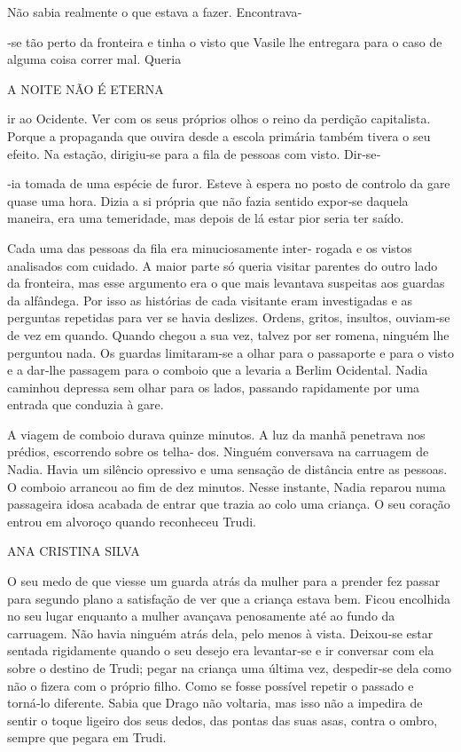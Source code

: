 Não sabia realmente o que estava a fazer. Encontrava‑

‑se tão perto da fronteira e tinha o visto que Vasile lhe entregara para
o caso de alguma coisa correr mal. Queria

A NOITE NÃO É ETERNA

ir ao Ocidente. Ver com os seus próprios olhos o reino da perdição
capitalista. Porque a propaganda que ouvira desde a escola primária
também tivera o seu efeito. Na estação, dirigiu‑se para a fila de
pessoas com visto. Dir‑se‑

‑ia tomada de uma espécie de furor. Esteve à espera no posto de controlo
da gare quase uma hora. Dizia a si própria que não fazia sentido
expor‑se daquela maneira, era uma temeridade, mas depois de lá estar
pior seria ter saído.

Cada uma das pessoas da fila era minuciosamente inter‑ rogada e os
vistos analisados com cuidado. A maior parte só queria visitar parentes
do outro lado da fronteira, mas esse argumento era o que mais levantava
suspeitas aos guardas da alfândega. Por isso as histórias de cada
visitante eram investigadas e as perguntas repetidas para ver se havia
deslizes. Ordens, gritos, insultos, ouviam‑se de vez em quando. Quando
chegou a sua vez, talvez por ser romena, ninguém lhe perguntou nada. Os
guardas limitaram‑se a olhar para o passaporte e para o visto e a
dar‑lhe passagem para o comboio que a levaria a Berlim Ocidental. Nadia
caminhou depressa sem olhar para os lados, passando rapidamente por uma
entrada que conduzia à gare.

A viagem de comboio durava quinze minutos. A luz da manhã penetrava nos
prédios, escorrendo sobre os telha‑ dos. Ninguém conversava na carruagem
de Nadia. Havia um silêncio opressivo e uma sensação de distância entre
as pessoas. O comboio arrancou ao fim de dez minutos. Nesse instante,
Nadia reparou numa passageira idosa acabada de entrar que trazia ao colo
uma criança. O seu coração entrou em alvoroço quando reconheceu Trudi.

ANA CRISTINA SILVA

O seu medo de que viesse um guarda atrás da mulher para a prender fez
passar para segundo plano a satisfação de ver que a criança estava bem.
Ficou encolhida no seu lugar enquanto a mulher avançava penosamente até
ao fundo da carruagem. Não havia ninguém atrás dela, pelo menos à vista.
Deixou‑se estar sentada rigidamente quando o seu desejo era levantar‑se
e ir conversar com ela sobre o destino de Trudi; pegar na criança uma
última vez, despedir‑se dela como não o fizera com o próprio filho. Como
se fosse possível repetir o passado e torná‑lo diferente. Sabia que
Drago não voltaria, mas isso não a impedira de sentir o toque ligeiro
dos seus dedos, das pontas das suas asas, contra o ombro, sempre que
pegara em Trudi.

